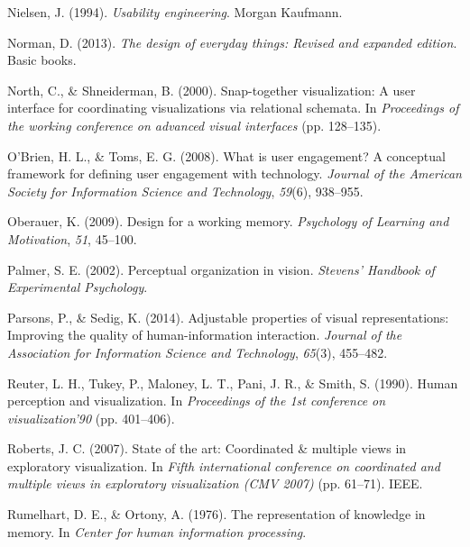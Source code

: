 \documentclass[print]{nuthesis}
\newlength{\cslhangindent}
\newenvironment{CSLReferences}[2]%
{\setlength{\parindent}{0pt}%
\everypar{\setlength{\hangindent}{\cslhangindent}}\ignorespaces}%
{\par}
\begin{document}
\begin{CSLReferences}{1}{0}
\leavevmode{}%
Nielsen, J. (1994). \emph{Usability engineering}. Morgan Kaufmann.

\leavevmode{}%
Norman, D. (2013). \emph{The design of everyday things: Revised and expanded edition}. Basic books.

\leavevmode{}%
North, C., \& Shneiderman, B. (2000). Snap-together visualization: A user interface for coordinating visualizations via relational schemata. In \emph{Proceedings of the working conference on advanced visual interfaces} (pp. 128--135).

\leavevmode{}%
O'Brien, H. L., \& Toms, E. G. (2008). What is user engagement? A conceptual framework for defining user engagement with technology. \emph{Journal of the American Society for Information Science and Technology}, \emph{59}(6), 938--955.

\leavevmode{}%
Oberauer, K. (2009). Design for a working memory. \emph{Psychology of Learning and Motivation}, \emph{51}, 45--100.

\leavevmode{}%
Palmer, S. E. (2002). Perceptual organization in vision. \emph{Stevens' Handbook of Experimental Psychology}.

\leavevmode{}%
Parsons, P., \& Sedig, K. (2014). Adjustable properties of visual representations: Improving the quality of human-information interaction. \emph{Journal of the Association for Information Science and Technology}, \emph{65}(3), 455--482.

\leavevmode{}%
Reuter, L. H., Tukey, P., Maloney, L. T., Pani, J. R., \& Smith, S. (1990). Human perception and visualization. In \emph{Proceedings of the 1st conference on visualization'90} (pp. 401--406).

\leavevmode{}%
Roberts, J. C. (2007). State of the art: Coordinated \& multiple views in exploratory visualization. In \emph{Fifth international conference on coordinated and multiple views in exploratory visualization (CMV 2007)} (pp. 61--71). IEEE.

\leavevmode{}%
Rumelhart, D. E., \& Ortony, A. (1976). The representation of knowledge in memory. In \emph{Center for human information processing}.


\end{CSLReferences}
\end{document}
